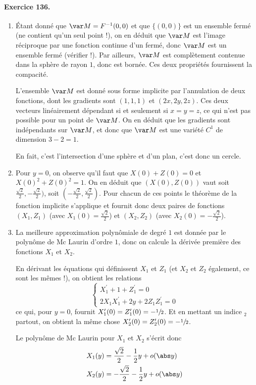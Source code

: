 \paragraph{Exercice 136.}
\begin{enumerate}
\item Étant donné que $\var M = F^{-1}(0,0)$ et que $\{(0,0)\}$ est un
ensemble fermé (ne contient qu'un seul point !), on en déduit que
$\var M$ est l'image réciproque par une fonction continue d'un
fermé, donc $\var M$ est un ensemble fermé (vérifier !).  Par
ailleurs, $\var M$ est complètement contenue dans la sphère de rayon
$1$, donc est bornée. Ces deux propriétés fournissent la compacité.

L'ensemble $\var M$ est donné sous forme implicite par l'annulation
de deux fonctions, dont les gradients sont $(1,1,1)$ et $(2x,
2y,2z)$. Ces deux vecteurs linéairement dépendant si et seulement si
$x = y = z$, ce qui n'est pas possible pour un point de $\var M$. On
en déduit que les gradients sont indépendants sur $\var M$, et donc
que $\var M$ est une variété $C^1$ de dimension $3 - 2 = 1$.

En fait, c'est l'intersection d'une sphère et d'un plan, c'est donc
un cercle.

\item Pour $y = 0$, on observe qu'il faut que $X(0) + Z(0) = 0$ et
$X(0)^2 + Z(0)^2 = 1$. On en déduit que $(X(0),Z(0))$ vaut soit
$\frac{\sqrt2}{2},-\frac{\sqrt2}{2})$, soit
$(-\frac{\sqrt2}{2},\frac{\sqrt2}{2})$. Pour chacun de ces points le
théorème de la fonction implicite s'applique et fournit donc deux
paires de fonctions $(X_1,Z_1)$ (avec $X_1(0) = \frac{\sqrt2}{2}$) et
$(X_2,Z_2)$ (avec $X_2(0) = -\frac{\sqrt2}{2}$).

\item La meilleure approximation polynômiale de degré $1$ est donnée
par le polynôme de Mc Laurin d'ordre $1$, donc on calcule la dérivée
première des fonctions $X_1$ et $X_2$.

En dérivant les équations qui définissent $X_1$ et $Z_1$ (et $X_2$
et $Z_2$ également, ce sont les mêmes !), on obtient les relations
\begin{equation*}
\begin{cases}
X_1^\prime + 1 + Z_1^\prime = 0\\
2 X_1 X_1^\prime + 2 y + 2 Z_1 Z_1^\prime = 0
\end{cases}
\end{equation*}
ce qui, pour $y = 0$, fournit $X_1^\prime(0) = Z_1^\prime(0) =
-\sfrac12$. Et en mettant un indice ${}_2$ partout, on obtient la
même chose $X_2^\prime(0) = Z_2^\prime(0) = -\sfrac12$.

Le polynôme de Mc Laurin pour $X_1$ et $X_2$ s'écrit donc
\begin{equation*}
\begin{split}
X_1(y) &= \frac{\sqrt2}{2} - \frac12 y + o(\abs y)\\
X_2(y) &= -\frac{\sqrt2}{2} - \frac12 y + o(\abs y)\\
\end{split}
\end{equation*}
\end{enumerate}

